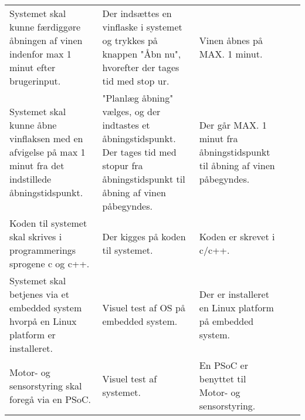 \begin{longtable}{ p{2cm}  p{2cm}  p{2cm}  p{1.5cm} p{2cm} }
	Systemet skal kunne færdiggøre åbningen af vinen indenfor max 1 minut efter brugerinput.& Der indsættes en vinflaske i systemet og trykkes på knappen "Åbn nu", hvorefter der tages tid med stop ur.& Vinen åbnes på MAX. 1 minut. & &\\
	
	Systemet skal kunne åbne vinflaksen med en afvigelse på max 1 minut fra det indstillede åbningstidspunkt.& "Planlæg åbning" vælges, og der indtastes et åbningstidspunkt. Der tages tid med stopur fra åbningstidspunkt til åbning af vinen påbegyndes.& Der går MAX. 1 minut fra åbningstidspunkt til åbning af vinen påbegyndes. & &\\ 
	  
	Koden til systemet skal skrives i programmerings sprogene c og c++.& Der kigges på koden til systemet.& Koden er skrevet i c/c++. & &\\ 
	
	Systemet skal betjenes via et embedded system hvorpå en Linux platform er installeret.& Visuel test af OS på embedded system.& Der er installeret en Linux platform på embedded system. & &\\ 
	
	Motor- og sensorstyring skal foregå via en PSoC.& Visuel test af systemet.& En PSoC er benyttet til Motor- og sensorstyring.& & \\  



\end{longtable}
